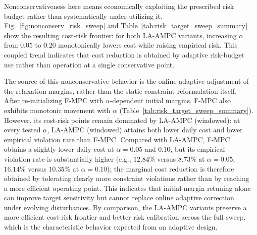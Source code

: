 \documentclass[a4paper,fleqn]{cas-dc}
\theoremstyle{plain}
\theoremstyle{remark}
\theoremstyle{plain}
\begin{document}
Nonconservativeness here means economically exploiting the prescribed risk budget rather than systematically under-utilizing it. Fig.~\ref{fig:nonconserv_risk_sweep} and Table~\ref{tab:risk_target_sweep_summary} show the resulting cost-risk frontier: for both LA-AMPC variants, increasing $\alpha$ from $0.05$ to $0.20$ monotonically lowers cost while raising empirical risk. This coupled trend indicates that cost reduction is obtained by adaptive risk-budget use rather than operation at a single conservative point.

The source of this nonconservative behavior is the online adaptive adjustment of the relaxation margins, rather than the static constraint reformulation itself. After re-initializing F-MPC with $\alpha$-dependent initial margins, F-MPC also exhibits monotonic movement with $\alpha$ (Table~\ref{tab:risk_target_sweep_summary}). However, its cost-risk points remain dominated by LA-AMPC (windowed): at every tested $\alpha$, LA-AMPC (windowed) attains both lower daily cost and lower empirical violation rate than F-MPC. Compared with LA-AMPC, F-MPC obtains a slightly lower daily cost at $\alpha=0.05$ and $0.10$, but its empirical violation rate is substantially higher (e.g., $12.84\%$ versus $8.73\%$ at $\alpha=0.05$, $16.14\%$ versus $10.35\%$ at $\alpha=0.10$); the marginal cost reduction is therefore obtained by tolerating clearly more constraint violations rather than by reaching a more efficient operating point. This indicates that initial-margin retuning alone can improve target sensitivity but cannot replace online adaptive correction under evolving disturbances. By comparison, the LA-AMPC variants preserve a more efficient cost-risk frontier and better risk calibration across the full sweep, which is the characteristic behavior expected from an adaptive design.
\end{document}
